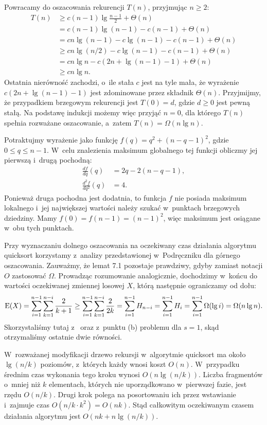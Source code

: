 Powracamy do oszacowania rekurencji $T(n)$, przyjmując $n\ge2$:
\begin{align*}
    T(n) &\ge c(n-1)\lg\frac{n-1}{2}+\Theta(n) \\
	&= c(n-1)\lg(n-1)-c(n-1)+\Theta(n) \\
	&= cn\lg(n-1)-c\lg(n-1)-c(n-1)+\Theta(n) \\
	&\ge cn\lg(n/2)-c\lg(n-1)-c(n-1)+\Theta(n) \\
	&= cn\lg n-c(2n+\lg(n-1)-1)+\Theta(n) \\
	&\ge cn\lg n.
\end{align*}
Ostatnia nierówność zachodzi, o~ile stała $c$ jest na tyle mała, że wyrażenie $c(2n+\lg(n-1)-1)$ jest zdominowane przez składnik $\Theta(n)$.
Przyjmijmy, że przypadkiem brzegowym rekurencji jest $T(0)=d$, gdzie $d\ge0$ jest pewną stałą.
Na podstawę indukcji możemy więc przyjąć $n=0$, dla którego $T(n)$ spełnia rozważane oszacowanie, a~zatem $T(n)=\Omega(n\lg n)$.

\exercise %
Potraktujmy wyrażenie jako funkcję $f(q)=q^2+(n-q-1)^2$, gdzie $0\le q\le n-1$.
W~celu znalezienia maksimum globalnego tej funkcji obliczmy jej pierwszą i~drugą pochodną:
\begin{align*}
    \frac{df}{dq}(q) &= 2q-2(n-q-1), \\
	\frac{d^2\!f}{dq^2}(q) &= 4.
\end{align*}
Ponieważ druga pochodna jest dodatnia, to funkcja $f$ nie posiada maksimum lokalnego i~jej największej wartości należy szukać w~punktach brzegowych dziedziny.
Mamy $f(0)=f(n-1)=(n-1)^2$, więc maksimum jest osiągane w~obu tych punktach.

\exercise %
Przy wyznaczaniu dolnego oszacowania na oczekiwany czas działania algorytmu quicksort korzystamy z~analizy przedstawionej w~Podręczniku dla górnego oszacowania.
Zauważmy, że lemat 7.1 pozostaje prawdziwy, gdyby zamiast notacji $O$ zastosować $\Omega$.
Prowadząc rozumowanie analogicznie, dochodzimy w~końcu do wartości oczekiwanej zmiennej losowej $X$, którą następnie ograniczamy od dołu:
\[
	\operatorname{E}(X) = \sum_{i=1}^{n-1}\sum_{k=1}^{n-i}\frac{2}{k+1} \ge \sum_{i=1}^{n-1}\sum_{k=1}^{n-i}\frac{2}{2k} = \sum_{i=1}^{n-1}H_{n-i} = \sum_{i=1}^{n-1}H_i = \sum_{i=1}^{n-1}\Omega(\lg i) = \Omega(n\lg n).
\]
Skorzystaliśmy tutaj z~ oraz z~punktu (b) problemu  dla $s=1$, skąd otrzymaliśmy ostatnie dwie równości.

\exercise %
W~rozważanej modyfikacji drzewo rekursji w~algorytmie quicksort ma około $\lg(n/k)$ poziomów, z~których każdy wnosi koszt $O(n)$.
W~przypadku średnim czas wykonania tego kroku wynosi $O(n\lg(n/k))$.
Liczba fragmentów o~mniej niż $k$ elementach, których nie uporządkowano w~pierwszej fazie, jest rzędu $O(n/k)$.
Drugi krok polega na posortowaniu ich przez wstawianie i~zajmuje czas $O(n/k\cdot k^2)=O(nk)$.
Stąd całkowitym oczekiwanym czasem działania algorytmu jest $O(nk+n\lg(n/k))$.

